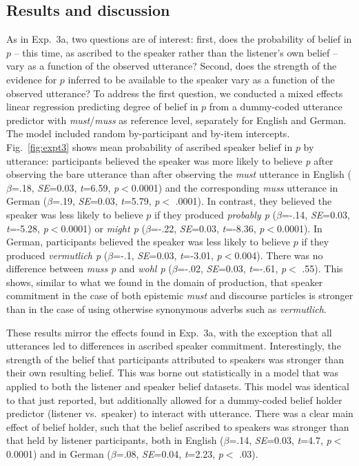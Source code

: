 \documentclass[11pt]{article}
\begin{document}
\subsection{Results and discussion}

As in Exp.~3a, two questions are of interest: first, does the probability of  belief in $p$ -- this time, as ascribed to the speaker rather than the listener's own belief --  vary as a function of the observed utterance? Second, does the strength of the evidence for $p$ inferred to be available to the speaker vary as a function of the observed utterance? To address the first question, we conducted a mixed effects linear regression predicting degree of belief in $p$ from a dummy-coded utterance predictor with \emph{must}/\emph{muss} as reference level, separately for English and German. The model included random by-participant and by-item intercepts. Fig.~\ref{fig:expt3} shows mean probability of ascribed speaker belief in $p$ by utterance: participants believed the speaker was more likely to believe \emph{p}  after observing the bare utterance than after observing the \emph{must} utterance in English   ($\beta$=.18, \emph{SE}=0.03, \emph{t}=6.59, \emph{p}$<$0.0001) and the corresponding \emph{muss} utterance in German ($\beta$=.19, \emph{SE}=0.03, \emph{t}=5.79, \emph{p}$<$ .0001). In contrast, they believed the speaker was less likely to believe $p$ if they produced \emph{probably p} ($\beta$=-.14, \emph{SE}=0.03, \emph{t}=-5.28, \emph{p}$<$0.0001) or \emph{might p} ($\beta$=-.22, \emph{SE}=0.03, \emph{t}=-8.36, \emph{p}$<$0.0001). In German, participants believed the speaker was less likely to believe $p$ if they produced \emph{vermutlich p} ($\beta$=-.1, \emph{SE}=0.03, \emph{t}=-3.01, \emph{p}$<$0.004). There was no difference between \emph{muss p} and \emph{wohl p} ($\beta$=-.02, \emph{SE}=0.03, \emph{t}=-.61, \emph{p}$<$ .55).  This shows, similar to what we found in the domain of production, that speaker commitment in the case of both epistemic \emph{must} and discourse particles is stronger than in the case of using otherwise synonymous adverbs such as \emph{vermutlich}.

These results mirror the effects found in Exp.~3a, with the exception that all utterances led to differences in ascribed speaker commitment. Interestingly, the strength of the belief that participants attributed to speakers was stronger than their own resulting belief. This was borne out statistically in a model that was applied to both the listener and speaker belief datasets. This model was identical to that just reported, but additionally allowed for a dummy-coded belief holder predictor (listener vs.~speaker)  to interact with utterance. There was a clear main effect of belief holder, such that the belief ascribed to speakers was stronger than that held by listener participants, both in English ($\beta$=.14, \emph{SE}=0.03, \emph{t}=4.7, \emph{p}$<$0.0001) and in German ($\beta$=.08, \emph{SE}=0.04, \emph{t}=2.23, \emph{p}$<$ .03). 
\end{document}

